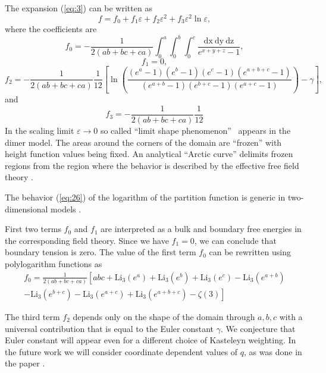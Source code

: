 \documentclass{article}
\newcommand{\Li}{\mathrm{Li}}
\newcommand{\dx}{\mathrm{dx}~}
\newcommand{\dy}{\mathrm{dy}~}
\newcommand{\dz}{\mathrm{dz}}
\begin{document}
The expansion  (\ref{eq:3}) can be written as
\begin{equation}
  \label{eq:26}
  f=f_{0}+f_{1}\varepsilon + f_{2}\varepsilon^{2} +f_{3}\varepsilon^{2}\ln\varepsilon,
\end{equation}
where the coefficients are
\begin{equation}
  \label{eq:27}
  f_{0}=-\frac{1}{2(ab+bc+ca)}\int_{0}^{a} \int_{0}^{b}\int_{0}^{c}\frac{\dx \dy \dz}{e^{x+y+z}-1},
\end{equation}
\begin{equation}
  \label{eq:28}
  f_{1}=0,
\end{equation}
\begin{equation}
  \label{eq:29}
  f_{2}=-\frac{1}{2(ab+bc+ca)}\frac{1}{12}\left[\ln\left(\frac{(e^{a}-1)(e^{b}-1)(e^{c}-1)(e^{a+b+c}-1)}{(e^{a+b}-1)(e^{b+c}-1)(e^{a+c}-1)}\right)-
    \gamma\right],
\end{equation}
and
\begin{equation}
  \label{eq:30}
  f_{3}=-\frac{1}{2(ab+bc+ca)}\frac{1}{12}
\end{equation}
In the scaling limit $\varepsilon\to 0$ so called ``limit shape phenomenon''~\cite{kenyon2006dimers}
appears in the dimer model. The areas around the corners of the domain are ``frozen'' with height
function values being fixed. An analytical ``Arctic curve'' delimits frozen regions from the region
where the behavior is described by the effective free field theory
\cite{kenyon2009lectures,kenyon2008height,kenyon2006dimers}.

The behavior (\ref{eq:26}) of the logarithm of the partition function is generic in two-dimensional
models \cite{cardy1988finite}.

First two terms $f_{0}$ and $f_{1}$ are interpreted as a bulk and
boundary free energies in the corresponding field theory. Since we have $f_{1}=0$, we can conclude
that boundary tension is zero.
The value of the first term $f_{0}$ can be rewritten using polylogarithm functions as
\begin{multline}
  \label{eq:34}
  f_{0}=\frac{1}{2(ab+bc+ca)}\left[abc + \Li_{3}(e^{a})+\Li_{3}(e^{b})+\Li_{3}(e^{c})-
    \Li_{3}(e^{a+b})\right.\\
  \left.-\Li_{3}(e^{b+c})-    \Li_{3}(e^{a+c})+    \Li_{3}(e^{a+b+c})-\zeta(3)\right]
\end{multline}


The third term $f_{2}$ depends only on the shape of the domain through $a,b,c$ with a universal
contribution that is equal to the Euler constant $\gamma$. We conjecture that Euler constant will
appear even for a different choice of Kasteleyn weighting. In the future work we will consider
coordinate dependent values of $q$, as was done in the paper \cite{okounkov2007random}. 
\end{document}
